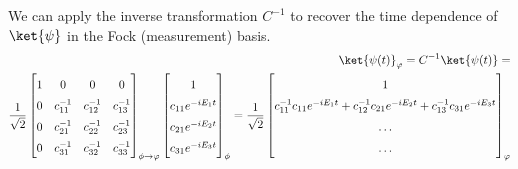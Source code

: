 We can apply the inverse transformation $C^{-1}$ to recover the time dependence of $\ket{\psi}$ in the Fock (measurement) basis.
\begin{equation*}
    \begin{aligned}
    \ket{\psi(t)}_{\varphi} =
    C^{-1}\ket{\psi(t)}= \\
    \frac{1}{\sqrt{2}}
    \renewcommand*{\arraystretch}{1.5}
    \begin{bmatrix}
        1 & 0 & 0 & 0 \\
        0 & c^{-1}_{11} & c^{-1}_{12} & c^{-1}_{13} \\
        0 & c^{-1}_{21} & c^{-1}_{22} & c^{-1}_{23} \\
        0 & c^{-1}_{31} & c^{-1}_{32} & c^{-1}_{33} \\
    \end{bmatrix}_{\phi \rightarrow \varphi}
    \begin{bmatrix}
        1 \\
        c_{11} e^{-i E_1 t} \\
        c_{21} e^{-i E_2 t} \\
        c_{31} e^{-i E_3 t}\\
    \end{bmatrix}_{\phi}
    =
    \frac{1}{\sqrt{2}}
    \begin{bmatrix}
        1 \\
        c^{-1}_{11} c_{11} e^{-i E_1 t} +  c^{-1}_{12} c_{21} e^{-i E_2 t} + c^{-1}_{13} c_{31} e^{-i E_3 t} \\
        \ldots \\
        \ldots \\
    \end{bmatrix}_{\varphi}
\end{aligned}
\end{equation*}

